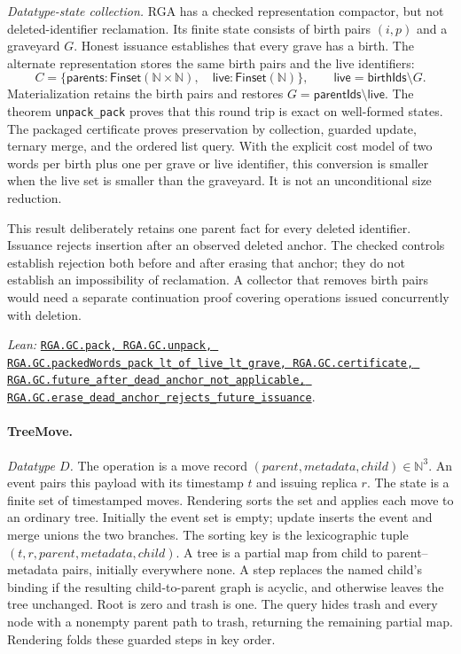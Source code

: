 \documentclass[11pt]{article}
\theoremstyle{definition}
\newcommand{\N}{\mathbb N}
\newcommand{\lean}[1]{\texttt{#1}}
\newcommand{\src}[2]{\href{../../#1}{\texttt{#2}}}
\newcommand{\anchor}[2]{\par\smallskip\noindent\emph{Lean: }\src{#1}{#2}.}
\begin{document}
\emph{Datatype-state collection.} RGA has a checked representation compactor, but not deleted-identifier
reclamation. Its finite state consists of birth pairs $(i,p)$ and a graveyard
$G$. Honest issuance establishes that every grave has a birth. The alternate
representation stores the same birth pairs and the live identifiers:
\[
 C=\{\mathsf{parents}:\mathsf{Finset}(\N\times\N),\quad
     \mathsf{live}:\mathsf{Finset}(\N)\},
 \qquad \mathsf{live}=\mathsf{birthIds}\setminus G.
\]
Materialization retains the birth pairs and restores
$G=\mathsf{parentIds}\setminus\mathsf{live}$.  The theorem
\lean{unpack\_pack} proves that this round trip is exact on well-formed
states.  The packaged certificate proves preservation by collection, guarded
update, ternary merge, and the ordered list query.  With the explicit cost
model of two words per birth plus one per grave or live identifier, this
conversion is smaller when the live set is smaller than the graveyard.
It is not an unconditional size reduction.

This result deliberately retains one parent fact for every deleted
identifier. Issuance rejects insertion after an observed deleted anchor.
The checked controls establish rejection both before and after erasing that
anchor; they do not establish an impossibility of reclamation. A collector
that removes birth pairs would need a separate continuation proof covering
operations issued concurrently with deletion.
\anchor{Sal/MRDTs/Instances/RGAGC.lean}
  {RGA.GC.pack, RGA.GC.unpack, RGA.GC.packedWords\_pack\_lt\_of\_live\_lt\_grave,
   RGA.GC.certificate, RGA.GC.future\_after\_dead\_anchor\_not\_applicable,
   RGA.GC.erase\_dead\_anchor\_rejects\_future\_issuance}

\paragraph{TreeMove.}

\emph{Datatype $D$.} The operation is a move record
$(\mathit{parent},\mathit{metadata},\mathit{child})\in\N^3$.
An event pairs this payload with its timestamp $t$ and issuing replica $r$.
The state is a finite set of timestamped moves. Rendering sorts the set and
applies each move to an ordinary tree. Initially the event set is empty;
update inserts the event and merge unions the two branches. The sorting key is the lexicographic tuple
$(t,r,\mathit{parent},\mathit{metadata},\mathit{child})$.
A tree is a partial map from child to parent--metadata pairs, initially
everywhere none. A step replaces the named child's binding if the resulting
child-to-parent graph is acyclic, and otherwise leaves the tree unchanged.
Root is zero and trash is one. The query hides trash and every node with a
nonempty parent path to trash, returning the remaining partial map.
Rendering folds these guarded steps in key order.
\end{document}
